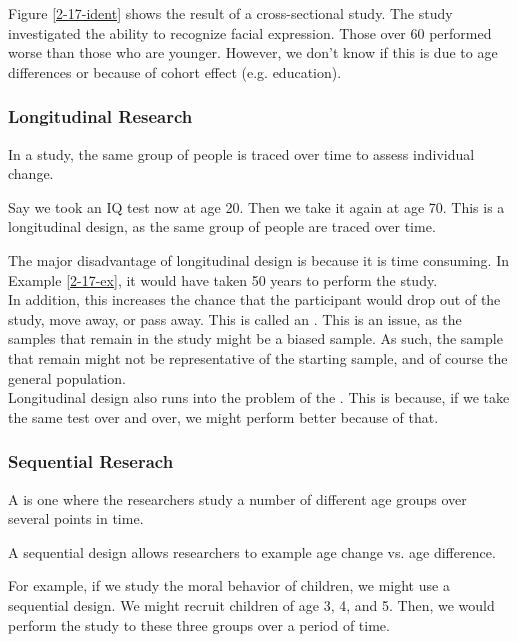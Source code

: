 \documentclass[../main/main.tex]{subfiles}
\begin{document}
\begin{example}
  Figure \ref{2-17-ident} shows the result of a  cross-sectional study.
The study investigated the ability to recognize facial expression. Those over 60 performed worse than those who are younger. However, we don't know if this is due to age differences or because of cohort effect (e.g. education).
\end{example}

\subsubsection{Longitudinal Research}

\begin{definition}
In a  study, the same group of people is traced over time to assess individual change.
\end{definition}
\begin{example}
Say we took an IQ test now at age 20. Then we take it again at age 70. This is a longitudinal design, as the same group of people are traced over time.
\label{2-17-ex}
\end{example}
\begin{remark}
  The major disadvantage of longitudinal design is because it is time consuming. In Example \ref{2-17-ex}, it would have taken 50 years to perform the study.\\

  In addition, this increases the chance that the participant would drop out of the study, move away, or pass away. This is called an .  This is an issue, as the samples that remain in the study might be a biased sample. As such, the sample that remain might not be representative of the starting sample, and of course the general population.\\

  Longitudinal design also runs into the problem of the . This is because, if we take the same test over and over, we might perform better because of that.

\end{remark}

\subsubsection{Sequential Reserach}
\begin{definition}
A  is one where the researchers study a number of different age groups over several points in time.
\end{definition}
\begin{remark}
A sequential design allows researchers to example age change vs. age difference.
\end{remark}
\begin{example}
For example, if we study the moral behavior of children, we might use a sequential design. We might recruit children of age 3, 4, and 5. Then, we would perform the study to these three groups over a period of time.
\end{example}
\end{document}
